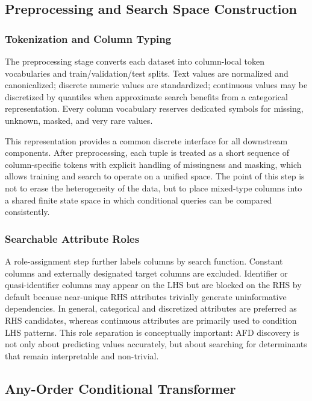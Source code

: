 \documentclass[conference]{IEEEtran}
\begin{document}
\subsection{Preprocessing and Search Space Construction}\label{sec:preprocess}

\subsubsection{Tokenization and Column Typing}

The preprocessing stage converts each dataset into column-local token vocabularies and train/validation/test splits. Text values are normalized and canonicalized; discrete numeric values are standardized; continuous values may be discretized by quantiles when approximate search benefits from a categorical representation. Every column vocabulary reserves dedicated symbols for missing, unknown, masked, and very rare values.

This representation provides a common discrete interface for all downstream components. After preprocessing, each tuple is treated as a short sequence of column-specific tokens with explicit handling of missingness and masking, which allows training and search to operate on a unified space. The point of this step is not to erase the heterogeneity of the data, but to place mixed-type columns into a shared finite state space in which conditional queries can be compared consistently.

\subsubsection{Searchable Attribute Roles}

A role-assignment step further labels columns by search function. Constant columns and externally designated target columns are excluded. Identifier or quasi-identifier columns may appear on the LHS but are blocked on the RHS by default because near-unique RHS attributes trivially generate uninformative dependencies. In general, categorical and discretized attributes are preferred as RHS candidates, whereas continuous attributes are primarily used to condition LHS patterns. This role separation is conceptually important: AFD discovery is not only about predicting values accurately, but about searching for determinants that remain interpretable and non-trivial.

\subsection{Any-Order Conditional Transformer}\label{sec:arch}
\end{document}

